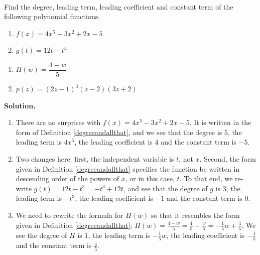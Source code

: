 \documentclass{ximera}
\begin{document}
\begin{ex}  \label{degreandallthatexample} $~$

Find the degree, leading term, leading coefficient and constant term of the following polynomial functions.

\begin{multicols}{2}
\begin{enumerate}

\item  $f(x) = 4x^5 - 3x^2 + 2x - 5$
\item $g(t) = 12t - t^3$

\setcounter{HW}{\value{enumi}}
\end{enumerate}
\end{multicols}

\begin{multicols}{2}
\begin{enumerate}
\setcounter{enumi}{\value{HW}}

\item  $H(w) = \dfrac{4-w}{5}$
\item  $p(z) = (2z-1)^{3}(z-2)(3z+2)$ 

\end{enumerate}
\end{multicols}

\smallskip

{\bf Solution.}  

\begin{enumerate}

\item  There are no surprises with $f(x) = 4x^5 - 3x^2 + 2x - 5$.  It is written in the form of Definition \ref{degreeandallthat}, and we see that the degree is $5$, the leading term is $4x^5$, the leading coefficient is $4$ and the constant term is $-5$.

\item Two changes here: first, the independent variable is $t$, not $x$.    Second, the form given in Definition \ref{degreeandallthat} specifies the function be written in descending order of the powers of $x$, or in this case, $t$.   To that end, we re-write $g(t) = 12t  - t^3 = -t^3+12t$, and see that the degree of $g$ is $3$, the leading term is $- t^3$, the leading coefficient is $-1$ and the constant term is $0$.

\item  We need to rewrite the formula for $H(w)$ so that it resembles the form given in Definition \ref{degreeandallthat}:  $H(w) = \frac{4-w}{5} = \frac{4}{5} - \frac{w}{5} = -\frac{1}{5} w + \frac{4}{5}$.  We see the degree of $H$ is $1$, the leading term is $-\frac{1}{5} w$, the leading coefficient is $-\frac{1}{5}$ and the constant term is $\frac{4}{5}$.


\end{enumerate}
\end{ex}
\end{document}
